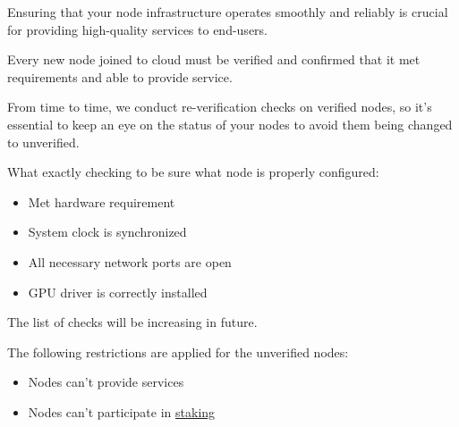 Ensuring that your node infrastructure operates smoothly and reliably is crucial for providing high-quality services to end-users.

Every new node joined to cloud must be verified and confirmed that it met requirements and able to provide service.

From time to time, we conduct re-verification checks on verified nodes, so it's essential to keep an eye on the status of your nodes to avoid them being changed to unverified.

What exactly checking to be sure what node is properly configured:

\begin{itemize}
    \item Met hardware requirement
    \item System clock is synchronized
    \item All necessary network ports are open
    \item GPU driver is correctly installed
\end{itemize}

The list of checks will be increasing in future.

The following restrictions are applied for the unverified nodes:

\begin{itemize}
    \item Nodes can't provide services
    \item Nodes can't participate in \hyperref[sec:staking]{staking}
\end{itemize}
